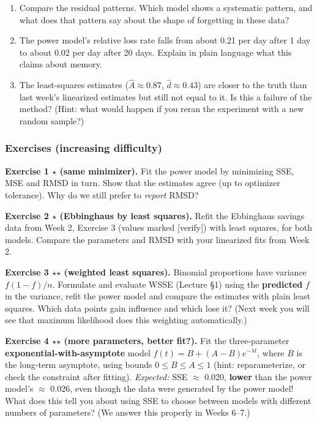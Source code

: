 \begin{enumerate}
\def\labelenumi{\arabic{enumi}.}
\tightlist
\item
  Compare the residual patterns. Which model shows a systematic pattern,
  and what does that pattern say about the shape of forgetting in these
  data?
\item
  The power model's relative loss rate falls from about 0.21 per day
  after 1 day to about 0.02 per day after 20 days. Explain in plain
  language what this claims about memory.
\item
  The least-squares estimates (\(\hat A \approx 0.87\),
  \(\hat d \approx 0.43\)) are closer to the truth than last week's
  linearized estimates but still not equal to it. Is this a failure of
  the method? (Hint: what would happen if you reran the experiment with
  a new random sample?)
\end{enumerate}

\subsubsection{Exercises (increasing difficulty)}

\textbf{Exercise 1 \ensuremath{\star} (same minimizer).} Fit the power model by
minimizing SSE, MSE and RMSD in turn. Show that the estimates agree (up
to optimizer tolerance). Why do we still prefer to \emph{report} RMSD?

\textbf{Exercise 2 \ensuremath{\star} (Ebbinghaus by least squares).} Refit the
Ebbinghaus savings data from Week 2, Exercise 3 (values marked
{[}verify{]}) with least squares, for both models. Compare the
parameters and RMSD with your linearized fits from Week 2.

\textbf{Exercise 3 \ensuremath{\star}\ensuremath{\star} (weighted least squares).} Binomial proportions
have variance \(f(1-f)/n\). Formulate and evaluate WSSE (Lecture §1) using the
\textbf{predicted} \(f\) in the variance, refit the power model and
compare the estimates with plain least squares. Which data points gain
influence and which lose it? (Next week you will see that maximum
likelihood does this weighting automatically.)

\textbf{Exercise 4 \ensuremath{\star}\ensuremath{\star} (more parameters, better fit?).} Fit the
three-parameter \textbf{exponential-with-asymptote} model
\(f(t) = B + (A - B)e^{-\lambda t}\), where \(B\) is the long-term
asymptote, using bounds \(0 \le B \le A \le 1\) (hint: reparameterize,
or check the constraint after fitting). \emph{Expected:} SSE \ensuremath{\approx} 0.020,
\textbf{lower} than the power model's \ensuremath{\approx} 0.026, even though the data were
generated by the power model! What does this tell you about using SSE to
choose between models with different numbers of parameters? (We answer
this properly in Weeks 6--7.)

